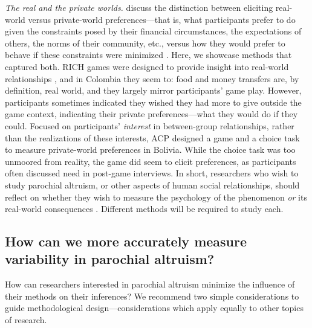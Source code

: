 \documentclass[bibauthoryear]{aa}
\begin{document}
\emph{The real and the private worlds.} \citet{Pisor2020} discuss the distinction between eliciting real-world versus private-world preferences---that is, what participants prefer to do given the constraints posed by their financial circumstances, the expectations of others, the norms of their community, etc., versus how they would prefer to behave if these constraints were minimized   \citep[see also][]{Naar2020}. Here, we showcase methods that captured both. RICH games were designed to provide insight into real-world relationships \citep{gervais2017rich, Pisor2020}, and in Colombia they seem to: food and money transfers are, by definition, real world, and they largely mirror participants' game play. However, participants sometimes indicated they wished they had more to give outside the game context, indicating their private preferences---what they would do if they could. Focused on participants' \emph{interest} in between-group relationships, rather than the realizations of these interests, ACP designed a game and a choice task to measure private-world preferences in Bolivia. While the choice task was too unmoored from reality, the game did seem to elicit preferences, as participants often discussed need in post-game interviews. In short, researchers who wish to study parochial altruism, or other aspects of human social relationships, should reflect on whether they wish to measure the psychology of the phenomenon \emph{or} its real-world consequences \citep{Pisor2020, Naar2020}. Different methods will be required to study each.

\subsection{How can we more accurately measure variability in parochial altruism?}

How can researchers interested in parochial altruism minimize the influence of their methods on their inferences? We recommend two simple considerations to guide methodological design---considerations which apply equally to other topics of research.
\end{document}
